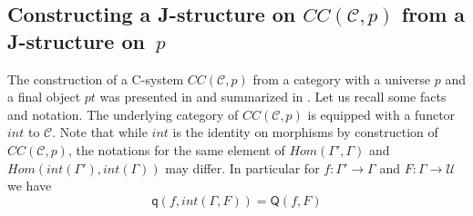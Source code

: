 \documentclass[12pt]{article}
\numberwithin{equation}{section}
\newenvironment{eq}{\begin{equation}}{\end{equation}}
\newcommand{\llabel}[1]{\label{#1}}
\newcommand{\sr}{\rightarrow}
\newcommand{\toCC}{CC} %
\newcommand{\C}{{\mathcal C}}  %
\newcommand{\q}{\mathsf{q}}
\newcommand{\U}{\mathcal{U}}
\newcommand{\Q}{\mathsf{Q}}
\begin{document}
\subsection{Constructing a J-structure on $\toCC({\C},p)$ from a J-structure on~$p$}
%
The construction of a C-system $\toCC({\C},p)$ from a category with a
universe $p$ and a final object $pt$ was presented in \cite{Cfromauniverse} and
summarized in \cite{fromunivwithPi}. Let us recall some facts and
notation. The underlying category of $\toCC({\C},p)$ is equipped with a
functor $int$ to $\C$. Note that while $int$ is the identity on
morphisms by construction of $\toCC({\C},p)$, the notations for the same
element of $Hom(\Gamma',\Gamma)$ and $Hom(int(\Gamma'),int(\Gamma))$ may
differ. In particular for $f:\Gamma'\sr \Gamma$ and $F:\Gamma\sr \U$ we have
%
\begin{eq}
\llabel{2015.04.02.eq2} \q(f,int(\Gamma,F))=\Q(f,F)
\end{eq}%
%
\end{document}
